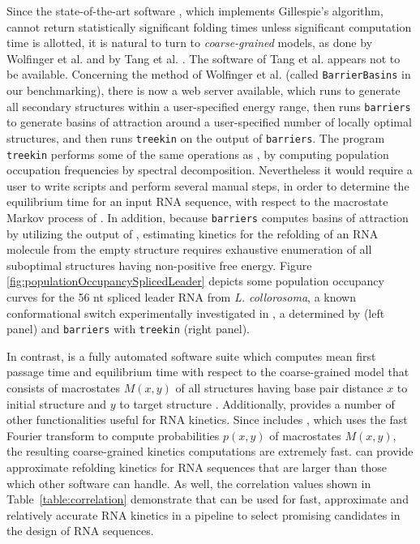Since the state-of-the-art software \kinfold, which implements
Gillespie's algorithm, cannot return statistically significant folding
times unless significant computation time is allotted, it is natural
to turn to {\em coarse-grained} models, as done by
Wolfinger et al. \cite{wolfingerStadler:kinetics} and by
Tang et al. \cite{Tang.jmb08}.  The software of Tang et al. appears not
to be available. Concerning the
method of Wolfinger et al. (called {\tt BarrierBasins} in our benchmarking),
there is now a web server available, which runs \rnasub
\cite{Wuchty.b99} to generate all secondary structures within a user-specified
energy range, then runs {\tt barriers} \cite{flammHofacker} to generate
basins of attraction around a user-specified number of locally optimal
structures, and then runs {\tt treekin} on the output of {\tt barriers}.
The program {\tt treekin} performs some of the same operations as \hermes,
by computing population occupation frequencies by spectral decomposition.
Nevertheless it would require a user to write scripts and perform
several manual steps, in order to determine the equilibrium time for
an input RNA sequence, with respect to the macrostate Markov process
of \cite{wolfingerStadler:kinetics}. In addition, because {\tt barriers} computes
basins of attraction by utilizing the output of \rnasub, estimating kinetics for the
refolding of an RNA molecule from the empty structure requires exhaustive enumeration
of all suboptimal structures having non-positive free energy.
Figure \ref{fig:populationOccupancySplicedLeader} depicts some population
occupancy curves for the 56 nt spliced leader RNA from
{\em L. collorosoma}, a known conformational switch experimentally
investigated in \cite{lecuyerCrothers}, a determined by
\hermes (left panel) and {\tt barriers} with {\tt treekin}
(right panel).

In contrast, \hermes is a fully automated software suite which
computes mean first passage time and equilibrium time with respect to
the coarse-grained model that consists of macrostates $M(x,y)$ of all
structures having base pair distance $x$ to initial structure \strA and
$y$ to target structure \strB. Additionally, \hermes provides
a number of other functionalities useful for RNA kinetics. Since
\hermes includes \ffttwo, which uses the fast Fourier transform
to compute probabilities $p(x,y)$ of macrostates $M(x,y)$, the resulting
coarse-grained kinetics computations are extremely fast. \hermes
can provide approximate refolding kinetics for RNA sequences that are
larger than those which other software can handle. As well, the
correlation values shown in Table~\ref{table:correlation}
demonstrate that \hermes can be used for fast, approximate and relatively
accurate RNA kinetics in a pipeline to select promising candidates in
the design of RNA sequences.


